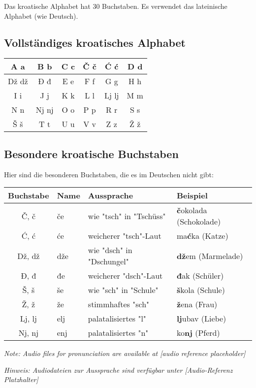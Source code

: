\begin{vocabulary}
Das kroatische Alphabet hat 30 Buchstaben. Es verwendet das lateinische Alphabet (wie Deutsch).

\subsection*{Vollständiges kroatisches Alphabet}

\begin{center}
\begin{tabular}{|c|c|c|c|c|c|}
\hline
A a & B b & C c & Č č & Ć ć & D d \\
\hline
Dž dž & Đ đ & E e & F f & G g & H h \\
\hline
I i & J j & K k & L l & Lj lj & M m \\
\hline
N n & Nj nj & O o & P p & R r & S s \\
\hline
Š š & T t & U u & V v & Z z & Ž ž \\
\hline
\end{tabular}
\end{center}

\subsection*{Besondere kroatische Buchstaben}

Hier sind die besonderen Buchstaben, die es im Deutschen nicht gibt:

\begin{center}
\begin{tabular}{clll}
\toprule
Buchstabe & Name & Aussprache & Beispiel \\
\midrule
Č, č & če & wie "tsch" in "Tschüss" & \textbf{č}okolada (Schokolade) \\
Ć, ć & će & weicherer "tsch"-Laut & ma\textbf{ć}ka (Katze) \\
Dž, dž & dže & wie "dsch" in "Dschungel" & \textbf{dž}em (Marmelade) \\
Đ, đ & đe & weicherer "dsch"-Laut & \textbf{đ}ak (Schüler) \\
Š, š & še & wie "sch" in "Schule" & \textbf{š}kola (Schule) \\
Ž, ž & že & stimmhaftes "sch" & \textbf{ž}ena (Frau) \\
Lj, lj & elj & palatalisiertes "l" & \textbf{lj}ubav (Liebe) \\
Nj, nj & enj & palatalisiertes "n" & ko\textbf{nj} (Pferd) \\
\bottomrule
\end{tabular}
\end{center}

\textit{Note: Audio files for pronunciation are available at [audio reference placeholder]}

\textit{Hinweis: Audiodateien zur Aussprache sind verfügbar unter [Audio-Referenz Platzhalter]}
\end{vocabulary}

